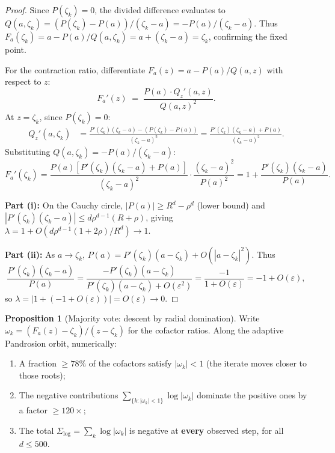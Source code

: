 \documentclass[11pt,a4paper]{article}
\theoremstyle{definition}
\newtheorem{proposition}{Proposition}[section]
\begin{document}
\begin{proof}
Since $P(\zeta_k) = 0$, the divided difference evaluates to $Q(a,\zeta_k) = (P(\zeta_k) - P(a))/(\zeta_k - a) = -P(a)/(\zeta_k - a)$.  Thus $F_a(\zeta_k) = a - P(a)/Q(a,\zeta_k) = a + (\zeta_k - a) = \zeta_k$, confirming the fixed point.

For the contraction ratio, differentiate $F_a(z) = a - P(a)/Q(a,z)$ with respect to $z$:
\[
  F_a'(z) \;=\; \frac{P(a) \cdot Q_z'(a,z)}{Q(a,z)^2}.
\]
At $z = \zeta_k$, since $P(\zeta_k) = 0$:
\begin{align*}
  Q_z'(a,\zeta_k) &= \frac{P'(\zeta_k)(\zeta_k - a) - (P(\zeta_k) - P(a))}{(\zeta_k - a)^2} = \frac{P'(\zeta_k)(\zeta_k - a) + P(a)}{(\zeta_k - a)^2}.
\end{align*}
Substituting $Q(a,\zeta_k) = -P(a)/(\zeta_k - a)$:
\[
  F_a'(\zeta_k) = \frac{P(a)[P'(\zeta_k)(\zeta_k - a) + P(a)]}{(\zeta_k - a)^2} \cdot \frac{(\zeta_k - a)^2}{P(a)^2} = 1 + \frac{P'(\zeta_k)(\zeta_k - a)}{P(a)}.
\]

\textbf{Part (i):} On the Cauchy circle, $|P(a)| \geq R^d - \rho^d$ (lower bound) and $|P'(\zeta_k)(\zeta_k - a)| \leq d\rho^{d-1}(R+\rho)$, giving $\lambda = 1 + O(d\rho^{d-1}(1+2\rho)/R^d) \to 1$.

\textbf{Part (ii):} As $a \to \zeta_k$, $P(a) = P'(\zeta_k)(a - \zeta_k) + O(|a-\zeta_k|^2)$.  Thus
\[
  \frac{P'(\zeta_k)(\zeta_k - a)}{P(a)} = \frac{-P'(\zeta_k)(a - \zeta_k)}{P'(\zeta_k)(a-\zeta_k) + O(\varepsilon^2)} = \frac{-1}{1 + O(\varepsilon)} = -1 + O(\varepsilon),
\]
so $\lambda = |1 + (-1 + O(\varepsilon))| = O(\varepsilon) \to 0$.
\end{proof}

\begin{proposition}[Majority vote: descent by radial domination]
\label{prop:majority_vote}
Write $\omega_k = (F_a(z) - \zeta_k)/(z - \zeta_k)$ for the cofactor ratios.  Along the adaptive Pandrosion orbit, numerically:
\begin{enumerate}
  \item[\textup{(i)}] A fraction $\geq 78\%$ of the cofactors satisfy $|\omega_k| < 1$ (the iterate moves closer to those roots);
  \item[\textup{(ii)}] The negative contributions $\sum_{\{k : |\omega_k|<1\}} \log|\omega_k|$ dominate the positive ones by a factor $\geq 120\times$;
  \item[\textup{(iii)}] The total $\Sigma_{\log} = \sum_k \log|\omega_k|$ is negative at \textbf{every} observed step, for all $d \leq 500$.
\end{enumerate}
\end{proposition}
\end{document}
